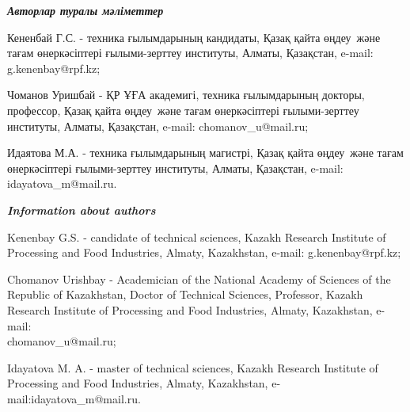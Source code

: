 \begin{info}
\emph{{\bfseries Авторлар туралы мәліметтер}}

Кененбай Г.С. - техника ғылымдарының кандидаты, Қазақ қайта өңдеу~және
тағам өнеркәсіптері ғылыми-зерттеу институты, Алматы, Қазақстан, e-mail:
g.kenenbay@rpf.kz;

Чоманов Уришбай - ҚР ҰҒА академигі, техника ғылымдарының докторы,
профессор, Қазақ қайта өңдеу~және тағам өнеркәсіптері ғылыми-зерттеу
институты, Алматы, Қазақстан, e-mail:
chomanov\_u@mail.ru;

Идаятова М.А. - техника ғылымдарының магистрі, Қазақ қайта өңдеу~және
тағам өнеркәсіптері ғылыми-зерттеу институты, Алматы, Қазақстан, e-mail:
idayatova\_m@mail.ru.

\emph{{\bfseries Information about authors}}

Kenenbay G.S. - candidate of technical sciences, Kazakh Research
Institute of Processing and Food Industries, Almaty, Kazakhstan, e-mail:
g.kenenbay@rpf.kz;

Chomanov Urishbay - Academician of the National Academy of Sciences of
the Republic of Kazakhstan, Doctor of Technical Sciences, Professor,
Kazakh Research Institute of Processing and Food Industries, Almaty,
Kazakhstan, e-mail:\\
chomanov\_u@mail.ru;

Idayatova M. A. - master of technical sciences, Kazakh Research
Institute of Processing and Food Industries, Almaty, Kazakh\-stan,
e-mail:idayatova\_m@mail.ru.
\end{info}
